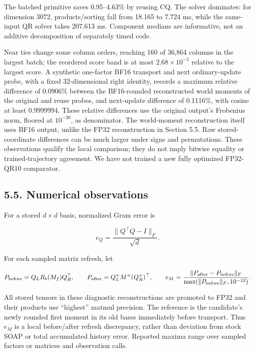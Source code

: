 \documentclass[
  10pt,
]{article}
\begin{document}
The batched primitive saves 0.95--4.63\% by reusing CQ. The solver
dominates: for dimension 3072, products/sorting fall from 18.165 to
7.724 ms, while the same-input QR solver takes 207.613 ms. Component
medians are informative, not an additive decomposition of separately
timed code.

Near ties change some column orders, reaching 160 of 36,864 columns in
the largest batch; the reordered score band is at most
\(2.68\times10^{-5}\) relative to the largest score. A synthetic
one-factor BF16 transport and next ordinary-update probe, with a fixed
32-dimensional right identity, records a maximum relative difference of
0.0906\% between the BF16-rounded reconstructed world moments of the
original and reuse probes, and next-update difference of 0.1116\%, with
cosine at least 0.9999994. These relative differences use the original
output's Frobenius norm, floored at \(10^{-30}\), as denominator. The
world-moment reconstruction itself uses BF16 output, unlike the FP32
reconstruction in Section 5.5. Raw stored-coordinate differences can be
much larger under signs and permutations. These observations qualify the
local comparison; they do not imply bitwise equality or
trained-trajectory agreement. We have not trained a new fully optimized
FP32-QR10 comparator.

\hypertarget{numerical-observations}{%
\subsection{5.5. Numerical observations}\label{numerical-observations}}

For a stored \(d\times d\) basis, normalized Gram error is

\[
e_Q=\frac{\|Q^\top Q-I\|_F}{\sqrt d}.
\]

For each sampled matrix refresh, let

\[
P_{\rm before}=Q_L R_b(M_f)Q_R^\top,\qquad
P_{\rm after}=Q_L^+ M^+ (Q_R^+)^\top,\qquad
e_M=\frac{\|P_{\rm after}-P_{\rm before}\|_F}
{\max(\|P_{\rm before}\|_F,10^{-12})}.
\]

All stored tensors in these diagnostic reconstructions are promoted to
FP32 and their products use ``highest'' matmul precision. The reference
is the candidate's newly rounded first moment in its old bases
immediately before transport. Thus \(e_M\) is a local before/after
refresh discrepancy, rather than deviation from stock SOAP or total
accumulated history error. Reported maxima range over sampled factors or
matrices and observation calls.
\end{document}
